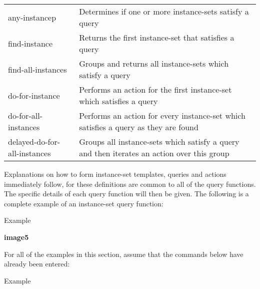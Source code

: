 \documentclass[letterpaper,10pt,english]{sphinxmanual}
\begin{document}
\begin{savenotes}\sphinxattablestart
\centering
\begin{tabulary}{\linewidth}[t]{|T|T|}
\hline
\sphinxstyletheadfamily 
{}
&\sphinxstyletheadfamily 
{}
\\
\hline
any-instancep
&
Determines if one or more instance-sets satisfy a query
\\
\hline
find-instance
&
Returns the first instance-set that satisfies a query
\\
\hline
find-all-instances
&
Groups and returns all instance-sets which satisfy a query
\\
\hline
do-for-instance
&
Performs an action for the first instance-set which satisfies a query
\\
\hline
do-for-all-instances
&
Performs an action for every instance-set which satisfies a query as they are found
\\
\hline
delayed-do-for-all-instances
&
Groups all instance-sets which satisfy a query and then iterates an action over this group
\\
\hline
\end{tabulary}
\par
\sphinxattableend\end{savenotes}

Explanations on how to form instance-set templates, queries and actions
immediately follow, for these definitions are common to all of the query
functions. The specific details of each query function will then be
given. The following is a complete example of an instance-set query
function:

Example

{\color{red}\bfseries{}\textbar{}image5\textbar{}}

For all of the examples in this section, assume that the commands below
have already been entered:

Example
\end{document}
